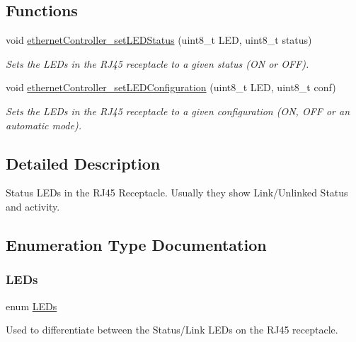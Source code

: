 \subsection*{Functions}
\begin{DoxyCompactItemize}
\item 
void \mbox{\hyperlink{group__leds_ga88905c196e37262340f8404fcb61ecf9}{ethernet\+Controller\+\_\+set\+L\+E\+D\+Status}} (uint8\+\_\+t L\+ED, uint8\+\_\+t status)
\begin{DoxyCompactList}\small\item\em Sets the L\+E\+Ds in the R\+J45 receptacle to a given status (ON or O\+FF). \end{DoxyCompactList}\item 
void \mbox{\hyperlink{group__leds_ga3ec0343a266cb8a4925097d708dd96f4}{ethernet\+Controller\+\_\+set\+L\+E\+D\+Configuration}} (uint8\+\_\+t L\+ED, uint8\+\_\+t conf)
\begin{DoxyCompactList}\small\item\em Sets the L\+E\+Ds in the R\+J45 receptacle to a given configuration (ON, O\+FF or an \textquotesingle{}automatic\textquotesingle{} mode). \end{DoxyCompactList}\end{DoxyCompactItemize}


\subsection{Detailed Description}
Status L\+E\+Ds in the R\+J45 Receptacle. Usually they show Link/\+Unlinked Status and activity. 



\subsection{Enumeration Type Documentation}
\mbox{\label{group__leds_gab6831a7d06c0a2bc69f9b024f6445a80}} 
\subsubsection{\texorpdfstring{LEDs}{LEDs}}
{\footnotesize\ttfamily enum \mbox{\hyperlink{group__leds_gab6831a7d06c0a2bc69f9b024f6445a80}{L\+E\+Ds}}}



Used to differentiate between the Status/\+Link L\+E\+Ds on the R\+J45 receptacle. 

